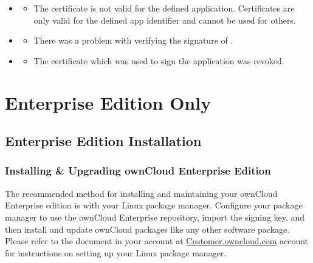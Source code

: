 \documentclass[letterpaper,10pt,english]{sphinxmanual}
\begin{document}
\begin{itemize}
\begin{itemize}
\begin{itemize}
\begin{itemize}
\end{itemize}

\item {} 
\begin{itemize}
\item {} 
The certificate is not valid for the defined application. Certificates
are only valid for the defined app identifier and cannot be used for
others.

\end{itemize}

\item {} 
\begin{itemize}
\item {} 
There was a problem with verifying the signature of .

\end{itemize}

\item {} 
\begin{itemize}
\item {} 
The certificate which was used to sign the application was revoked.

\end{itemize}

\end{itemize}

\end{itemize}

\end{itemize}


\chapter{Enterprise Edition Only}
\label{contents:enterprise-edition-only}

\section{Enterprise Edition Installation}
\label{enterprise_installation/index::doc}\label{enterprise_installation/index:enterprise-edition-installation}

\subsection{Installing \& Upgrading ownCloud Enterprise Edition}
\label{enterprise_installation/linux_installation:installing-upgrading-owncloud-enterprise-edition}\label{enterprise_installation/linux_installation::doc}
The recommended method for installing and maintaining your ownCloud Enterprise
edition is with your Linux package manager. Configure your package manager
to use the ownCloud Enterprise repository, import the signing key,
and then install and update ownCloud packages like any other software package.
Please refer to the  document in
your account at \href{https://customer.owncloud.com/owncloud/}{Customer.owncloud.com} account for instructions on setting
up your Linux package manager.
\end{document}
